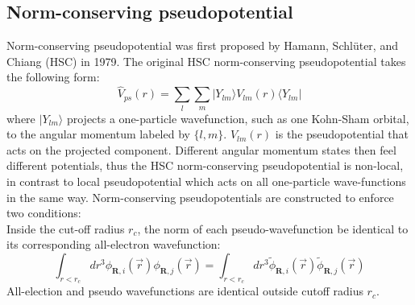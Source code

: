 \documentclass[UTF8]{ctexart}
\begin{document}
        \subsection{Norm-conserving pseudopotential}
        \indent Norm-conserving pseudopotential was first proposed by Hamann, Schlüter, and Chiang (HSC) in 1979. The original HSC
        norm-conserving pseudopotential takes the following form:
        \begin{equation}
            \hat{V}_{ps}(r)=\sum _{l}\sum _{m}|Y_{lm}\rangle V_{lm}(r)\langle Y_{lm}|
        \end{equation}
        where $|Y_{lm}\rangle$ projects a one-particle wavefunction, such as one Kohn-Sham orbital, to the angular momentum labeled by
        $\{l,m\}$. $V_{lm}(r)$ is the pseudopotential that acts on the projected component. Different angular momentum states then feel
        different potentials, thus the HSC norm-conserving pseudopotential is non-local, in contrast to local pseudopotential which acts
        on all one-particle wave-functions in the same way. Norm-conserving pseudopotentials are constructed to enforce two conditions:\\
        \indent Inside the cut-off radius $r_c$, the norm of each pseudo-wavefunction be identical to its corresponding all-electron wavefunction:
        \begin{equation}
            \int_{r<r_c}dr^3\phi_{\mathbf{R},i}({\vec{r}})\phi_{\mathbf{R},j}({\vec{r}})=
            \int_{r<r_{c}}dr^{3}{\tilde{\phi}}_{\mathbf{R},i}({\vec{r}}){\tilde{\phi}}_{\mathbf{R},j}({\vec{r}})
        \end{equation}
        \indent All-election and pseudo wavefunctions are identical outside cutoff radius $r_c$.
    
\end{document}
